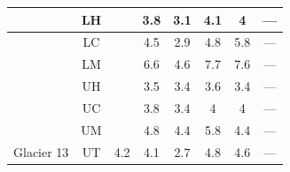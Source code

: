 \documentclass[12pt]{article}
\begin{document}
\begin{table}[]
\begin{tabular}{cccccccc}
  & LH &   & 3.8 & 3.1 & 4.1 & 4 & --- \\ \hline
  
  & LC &   & 4.5 & 2.9 & 4.8 & 5.8 & --- \\
  
  & LM &   & 6.6 & 4.6 & 7.7 & 7.6 & --- \\
  
  & UH &   & 3.5 & 3.4 & 3.6 & 3.4 & --- \\
  
  & UC &   & 3.8 & 3.4 & 4 & 4 & --- \\
  
  & UM &   & 4.8 & 4.4 & 5.8 & 4.4 & --- \\
  
\multirow{-7}{*}{ Glacier 13} & UT & \multirow{-7}{*}{ 4.2} & 4.1 & 2.7 & 4.8 & 4.6 & ---
\end{tabular}
\end{table}
\end{document}
